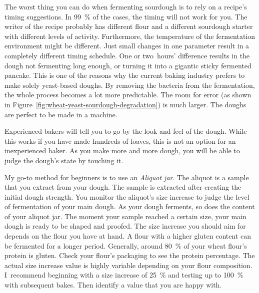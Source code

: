 The worst thing you can do when fermenting sourdough
is to rely on a recipe's timing suggestions. In \qty{99}{\percent}
of the cases, the timing will not work for you. The writer
of the recipe probably has different flour and a different
sourdough starter with different levels of activity. Furthermore,
the temperature of the fermentation environment might be
different. Just small changes in one parameter result
in a completely different timing schedule. One or two~hours'
difference results in the dough not fermenting long enough, or
turning it into a gigantic sticky fermented pancake. This
is one of the reasons why the current baking industry prefers
to make solely yeast-based doughs. By removing the bacteria
from the fermentation, the whole process becomes a lot more
predictable. The room for error (as shown in
Figure~\ref{fig:wheat-yeast-sourdough-degradation}) is much larger. The doughs
are perfect to be made in a machine.

\begin{flowchart}[!htb]
  \centering
  
  \caption[Process to check the bulk fermentation]{During the bulk
      fermentation, multiple doughs are fermented together in bulk.  A
      challenging aspect of homemade sourdough bread is to determine when this
      stage of fermentation is completed. This chart shows multiple available
      options to check on the bulk fermentation progress.}%
  \label{fig:bulk-fermentation}
\end{flowchart}

Experienced bakers will tell you to go by the look and feel of
the dough. While this works if you have made hundreds of loaves,
this is not an option for an inexperienced baker. As
you make more and more dough, you will be able to judge
the dough's state by touching it.

My go-to method for beginners is to use an \emph{Aliquot jar}.
The aliquot is a sample that you extract from your dough. The
sample is extracted after creating the initial dough strength.
You monitor the aliquot's size increase to judge the
level of fermentation of your main dough. As your
dough ferments, so does the content of your aliquot jar. The moment your
sample reached a certain size, your main dough is ready
to be shaped and proofed. The size increase you should
aim for depends on the flour you have at hand. A flour
with a higher gluten content can be fermented for a
longer period. Generally, around \qty{80}{\percent}
of your wheat flour's protein is gluten. Check your flour's
packaging to see the protein percentage. The actual size increase
value is highly variable depending on your flour composition.
I~recommend beginning with a size increase of \qty{25}{\percent} and testing
up to \qty{100}{\percent} with subsequent bakes. Then identify a value
that you are happy with.


